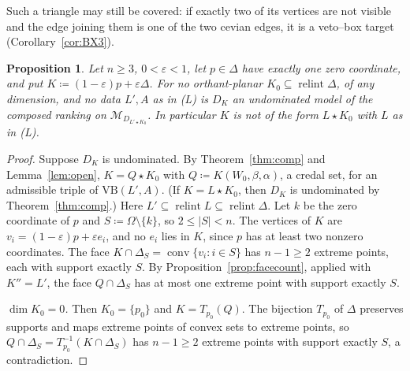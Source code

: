 \documentclass[11pt]{article}
\newcommand{\M}{\mathcal{M}}
\newcommand{\VB}{\mathrm{VB}}
\DeclareMathOperator{\conv}{conv}
\DeclareMathOperator{\relint}{relint}
\theoremstyle{plain}
\newtheorem{proposition}[theorem]{Proposition}
\theoremstyle{definition}
\theoremstyle{remark}
\begin{document}
Such a triangle may still be covered: if exactly two of its vertices are not visible and
the edge joining them is one of the two cevian edges, it is a veto--box target
(Corollary~\ref{cor:BX3}).

\begin{proposition}\label{prop:ZC}
Let $n\ge3$, $0<\varepsilon<1$, let $p\in\Delta$ have exactly one zero coordinate, and put
$K\coloneqq(1-\varepsilon)p+\varepsilon\Delta$. For no orthant-planar $K_0\subseteq
\relint\Delta$, of any dimension, and no data $L',A$ as in (L) is $D_K$ an undominated model
of the composed ranking on $\M_{D_{L'\star K_0}}$. In particular $K$ is not of the form
$L\star K_0$ with $L$ as in (L).
\end{proposition}

\begin{proof}
Suppose $D_K$ is undominated. By Theorem~\ref{thm:comp} and Lemma~\ref{lem:open},
$K=Q\star K_0$ with $Q\coloneqq K(W_0,\beta,\alpha)$, a credal set, for an admissible
triple of $\VB(L',A)$. (If $K=L\star K_0$, then $D_K$ is undominated by
Theorem~\ref{thm:comp}.) Here $L'\subseteq\relint L\subseteq\relint\Delta$. Let $k$ be the
zero coordinate of $p$ and $S\coloneqq\Omega\setminus\{k\}$, so $2\le|S|<n$. The vertices
of $K$ are $v_i=(1-\varepsilon)p+\varepsilon e_i$, and no $e_i$ lies in $K$, since $p$ has
at least two nonzero coordinates. The face $K\cap\Delta_S=\conv\{v_i:i\in S\}$ has
$n-1\ge2$ extreme points, each with support exactly $S$. By
Proposition~\ref{prop:facecount}, applied with $K''=L'$, the face $Q\cap\Delta_S$ has at
most one extreme point with support exactly $S$.

\emph{$\dim K_0=0$.} Then $K_0=\{p_0\}$ and $K=T_{p_0}(Q)$. The bijection $T_{p_0}$ of
$\Delta$ preserves supports and maps extreme points of convex sets to extreme points, so
$Q\cap\Delta_S=T_{p_0}^{-1}(K\cap\Delta_S)$ has $n-1\ge2$ extreme points with support
exactly $S$, a contradiction.


\end{proof}
\end{document}
